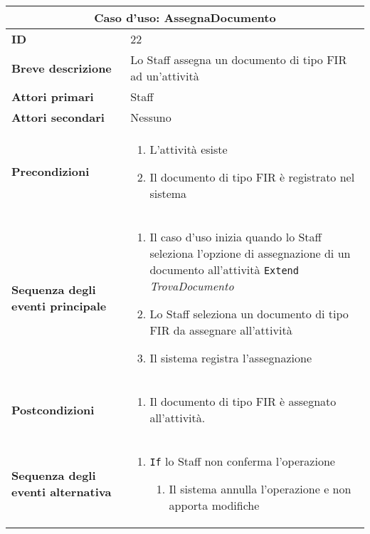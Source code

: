 \documentclass[a4paper]{report}
\begin{document}
\clearpage
\begin{table}[H]
\vspace*{-0cm}
\renewcommand{\arraystretch}{1.9}
\begin{tabular}{|p{3.9cm}|p{9.9cm}|}
\hline
\multicolumn{2}{|c|}{\textbf{Caso d’uso: AssegnaDocumento}} \\ \hline
	\textbf{ID} & 22 \\ \hline
	\textbf{Breve descrizione} & Lo Staff assegna un documento di tipo FIR ad un’attività \\ \hline
	\textbf{Attori primari} & Staff \\ \hline
	\textbf{Attori secondari} & Nessuno \\ \hline
	\textbf{Precondizioni} & \begin{enumerate}[leftmargin=14pt,label=\arabic*.,labelsep=0.5em,topsep=0pt,partopsep=0pt,parsep=0pt,itemsep=0pt]
    \item L’attività esiste
    \item Il documento di tipo FIR è registrato nel sistema
\end{enumerate} \\ \hline
	\textbf{Sequenza degli eventi principale} & \begin{enumerate}[leftmargin=14pt,label=\arabic*.,labelsep=0.5em,topsep=0pt,partopsep=0pt,parsep=0pt,itemsep=0pt]
    \item Il caso d'uso inizia quando lo Staff seleziona l'opzione di assegnazione di un documento all'attività
    \newline \texttt{Extend} \textit{TrovaDocumento}
    \item Lo Staff seleziona un documento di tipo FIR da assegnare all'attività
    \item Il sistema registra l’assegnazione
\end{enumerate} \\ \hline
	\textbf{Postcondizioni} & \begin{enumerate}[label=\arabic*.,leftmargin=14pt,labelsep=0.5em,topsep=0pt,partopsep=0pt,parsep=0pt,itemsep=0pt]
        \item Il documento di tipo FIR è assegnato all’attività.
    \end{enumerate} \\ \hline
	\textbf{Sequenza degli eventi alternativa} & \begin{enumerate}[leftmargin=14pt,label=\arabic*.,labelsep=0.5em,topsep=0pt,partopsep=0pt,parsep=0pt,itemsep=0pt]
    \item \texttt{If} lo Staff non conferma l’operazione
    \begin{enumerate}[label=\arabic{enumi}.\arabic*.,leftmargin=22pt,labelsep=0.5em,topsep=0pt,partopsep=0pt,parsep=0pt,itemsep=0pt]
        \item Il sistema annulla l’operazione e non apporta modifiche
    \end{enumerate}
\end{enumerate} \\ \hline
\end{tabular}
\end{table}
\end{document}
